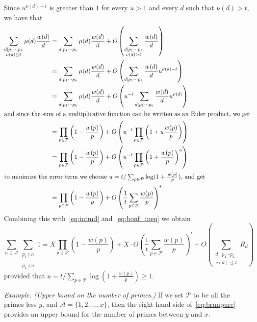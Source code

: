 \documentclass[12pt]{article}
\begin{document}
Since $u^{\nu(d)-t}$ is greater than $1$ for every $u>1$ and every
$d$ such that $\nu(d)>t$, we have that
\begin{align*}
\sum_{\substack{d\mid p_1\dotsb p_k\\\nu(d)\leq t}} \mu(d)
\frac{w(d)}{d}&=\sum_{d\mid p_1\dotsb p_k} \mu(d)
\frac{w(d)}{d}+O\left(\sum_{\substack{d\mid p_1\dotsb p_k\\\nu(d)>
t}} \frac{w(d)}{d}\right)\\
&=\sum_{d\mid p_1\dotsb p_k} \mu(d)
\frac{w(d)}{d}+O\left(\sum_{d\mid p_1\dotsb p_k}
\frac{w(d)}{d}u^{\nu(d)-t}\right)\\
&=\sum_{d\mid p_1\dotsb p_k} \mu(d)
\frac{w(d)}{d}+O\left(u^{-t}\sum_{d\mid p_1\dotsb p_k}
\frac{w(d)}{d}u^{\nu(d)}\right)\\
\intertext{and since the sum of a multiplicative function can be
written as an Euler product, we get} &=\prod_{p\in \mathcal{P}}
\left(1-\frac{w(p)}{p}\right)+O\left(u^{-t}\prod_{p\in
\mathcal{P}} \left(1+u\frac{w(p)}{p}\right) \right)\\
&=\prod_{p\in \mathcal{P}}
\left(1-\frac{w(p)}{p}\right)+O\left(u^{-t}\prod_{p\in
\mathcal{P}} \left(1+\frac{w(p)}{p}\right)^u \right)\\
\intertext{to minimize the error term we choose
$u=t/\sum_{p\in\mathcal{P}} \log(1+\frac{w(p)}{p})$, and get}
&=\prod_{p\in \mathcal{P}}
\left(1-\frac{w(p)}{p}\right)+O\left(\frac{1}{t}\sum_{p\in\mathcal{P}}
\frac{w(p)}{p} \right)^t
\end{align*}
Combining this with~\eqref{eq:intmd} and~\eqref{eq:bonf_ineq} we
obtain
\begin{equation}
\sum_{n\in\mathcal{A}}\sum_{\substack{p_1\nmid n\\\dots\\p_k\nmid
n}}1=X\prod_{p\in \mathcal{P}}
\left(1-\frac{w(p)}{p}\right)+X\cdot
O\left(\frac{1}{t}\sum_{p\in\mathcal{P}} \frac{w(p)}{p}
\right)^t+O\left(\sum_{\substack{d\mid p_1\dotsb p_k\\\nu(d)\leq
t}} R_d\right)\label{eq:brunpure}
\end{equation}
provided that $u=t/\sum_{p\in\mathcal{P}}
\log(1+\frac{w(p)}{p})\geq 1$.

\emph{Example. (Upper bound on the number of primes.)} If we set
$\mathcal{P}$ to be all the primes less $y$, and
$\mathcal{A}=\{1,2,\dotsc,x\}$, then the right hand side
of~\eqref{eq:brunpure} provides an upper bound for the number of
primes between $y$ and $x$.
\end{document}
